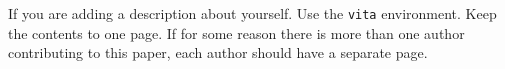 \documentclass{afitthesis}
\begin{document}
\nocite{*} %
\clearpage{} %
\printbibliography %

\begin{vita} %
    If you are adding a description about yourself. Use the \verb|vita|
    environment. Keep the contents to one page. If for some reason there is
    more than one author contributing to this paper, each author should have a
    separate page.
\end{vita}

\sfTwoNineEight
\end{document}
